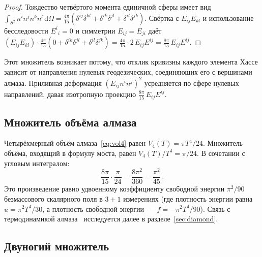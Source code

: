 \documentclass[12pt,a4paper]{article}
\theoremstyle{plain}
\theoremstyle{definition}
\theoremstyle{remark}
\newcommand{\dd}{\mathrm{d}}
\newcommand{\Esq}{E_{ij}E^{ij}}
\begin{document}
\begin{proof}
Тождество четвёртого момента единичной сферы имеет вид
$\int_{S^2} n^i n^j n^k n^l\,\dd\Omega
= \frac{4\pi}{15}(\delta^{ij}\delta^{kl} + \delta^{ik}\delta^{jl}
+ \delta^{il}\delta^{jk})$.
Свёртка с $E_{ij}E_{kl}$ и использование бесследовости
$E^i{}_i = 0$ и симметрии $E_{ij} = E_{ji}$ даёт
$(E_{ij}E_{kl}) \cdot \frac{4\pi}{15}
(0 + \delta^{ik}\delta^{jl} + \delta^{il}\delta^{jk})
= \frac{4\pi}{15} \cdot 2\, \Esq = \frac{8\pi}{15}\, \Esq$.
\end{proof}

Этот множитель возникает потому, что отклик кривизны каждого
элемента Хассе зависит от направления нулевых геодезических,
соединяющих его с вершинами алмаза.  Приливная деформация
$(E_{ij} n^i n^j)^2$ усредняется по сфере нулевых
направлений, давая изотропную проекцию
$\frac{8\pi}{15}\, \Esq$.

\subsection{Множитель объёма алмаза}
\label{sec:volume}

Четырёхмерный объём алмаза~\eqref{eq:vol4} равен
$V_4(T) = \pi T^4/24$.  Множитель объёма, входящий в
формулу моста, равен $V_4(T)/T^4 = \pi/24$.  В сочетании
с угловым интегралом:
\begin{equation}\label{eq:angvol}
  \frac{8\pi}{15} \cdot \frac{\pi}{24}
  = \frac{8\pi^2}{360} = \frac{\pi^2}{45}\,.
\end{equation}
Это произведение равно удвоенному коэффициенту свободной
энергии $\pi^2/90$ безмассового скалярного поля в $3{+}1$
измерениях (где плотность энергии равна
$u = \pi^2 T^4/30$, а плотность свободной энергии~---
$f = -\pi^2 T^4/90$).  Связь с термодинамикой
алмаза~\cite{MartRov:2003} исследуется далее в
разделе~\ref{sec:diamond}.

\subsection{Двуногий множитель}
\label{sec:factor4}
\end{document}
